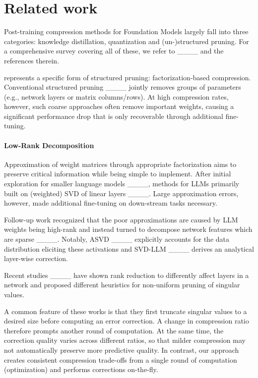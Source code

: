 \section{Related work}
\label{sec:related}
Post-training compression methods for Foundation Models largely fall into three categories: knowledge distillation, quantization and (un-)structured pruning. For a comprehensive survey covering all of these, we refer to ____ and the references therein.

\methodname represents a specific form of structured pruning: factorization-based compression. Conventional structured pruning ____ jointly removes groups of parameters (e.g., network layers or matrix columns/rows). At high compression rates, however, such coarse approaches often remove important weights, causing a significant performance drop that is only recoverable through additional fine-tuning.

\paragraph{Low-Rank Decomposition}
Approximation of weight matrices through appropriate factorization aims to preserve critical information while being simple to implement. 
After initial exploration for smaller language models ____, methods for LLMs primarily built on (weighted) SVD of linear layers ____. Large approximation errors, however, made additional fine-tuning on down-stream tasks necessary.

Follow-up work recognized that the poor approximations are caused by LLM weights being high-rank and instead turned to decompose network features which are sparse ____. 
Notably, ASVD ____ explicitly accounts for the data distribution eliciting these activations and SVD-LLM ____ derives an analytical layer-wise correction.

Recent studies ____ have shown rank reduction to differently affect layers in a network and proposed different heuristics for non-uniform pruning of singular values. 

A common feature of these works is that they first truncate singular values to a desired size before computing an error correction. A change in compression ratio therefore prompts another round of computation. At the same time, the correction quality varies across different ratios, so that milder compression may not automatically preserve more predictive quality. In contrast, our approach creates consistent compression trade-offs from a single round of computation (optimization) and performs corrections on-the-fly.

